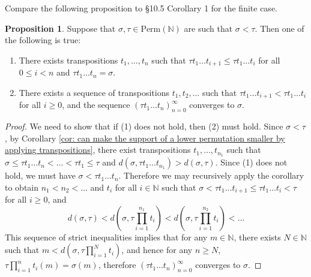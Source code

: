 \documentclass[oneside,11pt]{amsart}
\newcommand{\nn}{\ensuremath{\mathbb{N}}}
\newcommand{\Perm}{\ensuremath{\text{Perm}}}
\theoremstyle{definition}
\newtheorem{proof techniques}{Proof Techniques}
\newtheorem{proposition}{Proposition}
\begin{document}
Compare the following proposition to \cite{fulton1997} \S 10.5 Corollary 1 for the finite case. 


\begin{proposition}\label{prop: going infinitely far down in the bruhat order}
Suppose that $\sigma, \tau \in \Perm(\nn)$ are such that $\sigma < \tau$. Then one of the following is true: 

\begin{enumerate}

\item There exists transpositions $t_1,\ldots, t_n$ such that $\tau t_1 \ldots t_{i + 1} \leq \tau t_1 \ldots t_{i }$ for all $0 \leq i < n$ and $\tau t_1 \ldots t_n= \sigma$. 

\item There exists a sequence of transpositions $t_1, t_2, \ldots $ such that $\tau t_1 \ldots t_{i + 1} < \tau t_1 \ldots t_{i}$ for all $i \geq 0$, and the sequence $(\tau t_1 \ldots t_n)_{n = 0}^\infty$ converges to $\sigma$. 

\end{enumerate}
\end{proposition}

\begin{proof}
We need to show that if (1) does not hold, then (2) must hold. Since $\sigma < \tau$, by Corollary \ref{cor: can make the support of a lower permutation smaller by applying transpositions}, there exist transpositions $t_1, \ldots, t_{n_1}$ such that $\sigma \leq \tau t_1 \ldots t_n < \ldots < \tau t_1 \leq \tau$ and $d(\sigma ,  \tau  t_1 \ldots t_{n_1}) > d(\sigma , \tau)$. Since (1) does not hold, we must have $\sigma < \tau t_1 \ldots t_n$. Therefore we may recursively apply the corollary to obtain $n_1 < n_2 < \ldots$ and $t_i$ for all $i \in \nn$ such that $\sigma < \tau t_1 \ldots t_{i + 1} \leq \tau t_1 \ldots t_{i} < \tau$ for all $i \geq 0$, and 
\begin{equation*}
d(\sigma , \tau) < d(\sigma ,  \tau  \prod_{i = 1}^{n_1} t_i ) < d(\sigma ,  \tau  \prod_{i = 1}^{n_2} t_i ) < \ldots
\end{equation*}
This sequence of strict inequalities implies that for any $m \in \nn$, there exists $N \in \nn$ such that $m < d(\sigma ,  \tau  \prod_{i = 1}^{N} t_i )$, and hence for any $n \geq N$, $\tau  \prod_{i = 1}^{n} t_i (m) = \sigma(m)$, therefore $(\tau t_1 \ldots t_n)_{n = 0}^\infty$ converges to $\sigma$. 
\end{proof}
\end{document}
